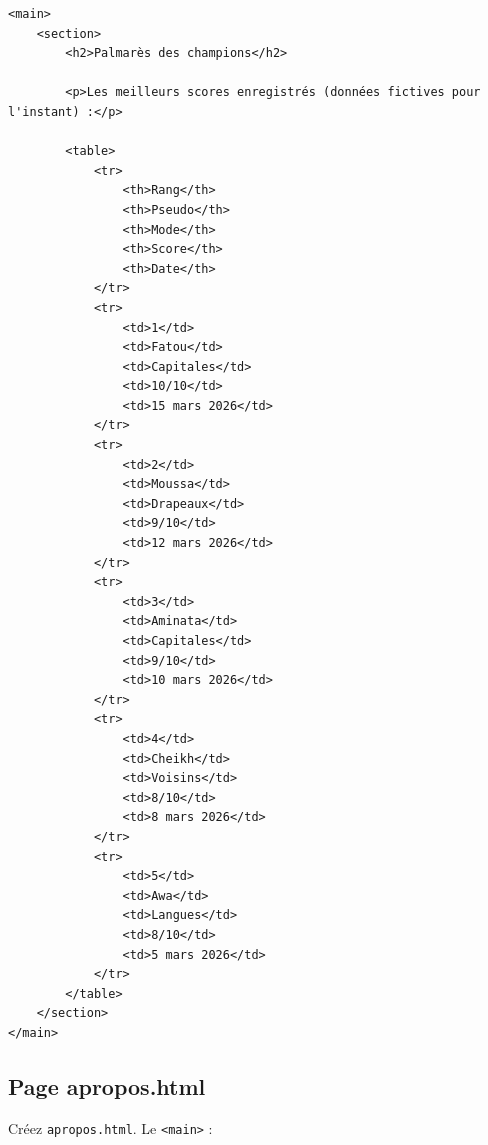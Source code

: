 \documentclass[11pt,a4paper]{article}
\begin{document}
\begin{lstlisting}[language=HTML5]
<main>
    <section>
        <h2>Palmarès des champions</h2>

        <p>Les meilleurs scores enregistrés (données fictives pour l'instant) :</p>

        <table>
            <tr>
                <th>Rang</th>
                <th>Pseudo</th>
                <th>Mode</th>
                <th>Score</th>
                <th>Date</th>
            </tr>
            <tr>
                <td>1</td>
                <td>Fatou</td>
                <td>Capitales</td>
                <td>10/10</td>
                <td>15 mars 2026</td>
            </tr>
            <tr>
                <td>2</td>
                <td>Moussa</td>
                <td>Drapeaux</td>
                <td>9/10</td>
                <td>12 mars 2026</td>
            </tr>
            <tr>
                <td>3</td>
                <td>Aminata</td>
                <td>Capitales</td>
                <td>9/10</td>
                <td>10 mars 2026</td>
            </tr>
            <tr>
                <td>4</td>
                <td>Cheikh</td>
                <td>Voisins</td>
                <td>8/10</td>
                <td>8 mars 2026</td>
            </tr>
            <tr>
                <td>5</td>
                <td>Awa</td>
                <td>Langues</td>
                <td>8/10</td>
                <td>5 mars 2026</td>
            </tr>
        </table>
    </section>
</main>
\end{lstlisting}

\subsection{Page apropos.html}

Créez \texttt{apropos.html}. Le \texttt{<main>} :
\end{document}
